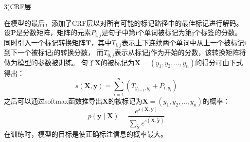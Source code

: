 3)CRF层

在模型的最后，添加了CRF层以对所有可能的标记路径中的最佳标记进行解码。
设$\mathbf{P}$是分数矩阵，矩阵的元素$P_{i,j}$是句子中第i个单词被标记为第j个标签的分数。 
同时引入一个标记转换矩阵$\mathbf{T}$，其中$T_{i,j}$表示上下连续两个单词中从上一个被标记i到下一个被标记j的转换分数，
而$T_{0,j}$表示从标记j作为开始的分数，该转换矩阵将做为模型的参数被训练。 
句子$\mathbf{X}$的被标记为$\mathbf{X}=(y_1,y_2,\dots,y_n)$的得分可由下式得出：
\begin{equation}
  s(\mathbf{X}, \mathbf{y})=\sum_{i=1}^{n}\left(T_{y_{i-1}, y_{i}}+P_{i, y_{i}}\right)
\end{equation}
之后可以通过softmax函数推导出$\mathbf{X}$的被标记为$\mathbf{X}=(y_1,y_2,\dots,y_n)$的概率：
\begin{equation}
  p(\mathbf{y} \mid \mathbf{X})=\frac{e^{s(\mathbf{X}, \mathbf{y})}}{\sum_{\tilde{\mathbf{y}}} e^{s(\mathbf{X}, \tilde{\mathbf{y}})}}
\end{equation}
在训练时，模型的目标是使正确标注信息的概率最大。









